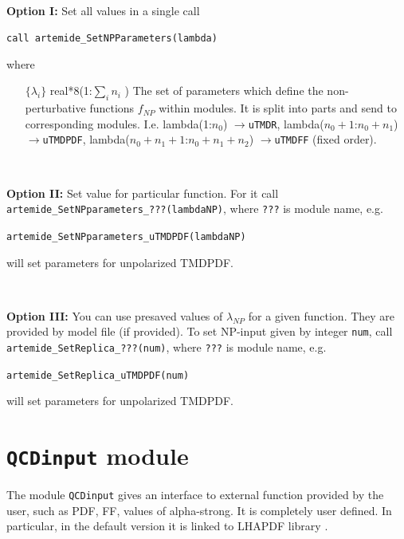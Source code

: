\documentclass[prd,nofootinbib,eqsecnum,final]{revtex4}
\renewcommand{\(}{\left(}
\renewcommand{\)}{\right)}
\renewcommand{\[}{\left[}
\renewcommand{\]}{\right]}
\begin{document}
~

\textbf{Option I: } Set all values in a single call

\texttt{call artemide{\_}SetNPParameters(lambda)}

where 
\begin{itemize}
\item[$\{\lambda_i\}$] real*8(1:$\sum_i n_i$ ) The set of parameters which define the non-perturbative functions $f_{NP}$ within modules. It is split into parts and send to corresponding modules. I.e. lambda(1:$n_0$) $\to$\texttt{uTMDR}, lambda($n_0+1$:$n_0+n_1$) $\to$\texttt{uTMDPDF},  lambda($n_0+n_1+1$:$n_0+n_1+n_2$) $\to$\texttt{uTMDFF} (fixed order). 
\end{itemize}

~

\textbf{Option II: } Set value for particular function. For it call \texttt{artemide\_SetNPparameters\_???(lambdaNP)}, where \texttt{???} is module name, e.g.

\texttt{\texttt{artemide\_SetNPparameters\_uTMDPDF(lambdaNP)}}

will set parameters for unpolarized TMDPDF.

~

\textbf{Option III: } You can use presaved values of $\lambda_{NP}$ for a given function. They are provided by model file (if provided). To set NP-input given by integer \texttt{num}, call \texttt{artemide\_SetReplica\_???(num)}, where \texttt{???} is module name, e.g.

\texttt{\texttt{artemide\_SetReplica\_uTMDPDF(num)}}

will set parameters for unpolarized TMDPDF.

\newpage

\section{\texttt{QCDinput} module}
\label{QCDinput}

The module \texttt{QCDinput} gives an interface to external function provided by the user, such as PDF, FF, values of alpha-strong. It is completely user defined. In particular, in the default version it is linked to LHAPDF library \cite{Buckley:2014ana}.
\end{document}
